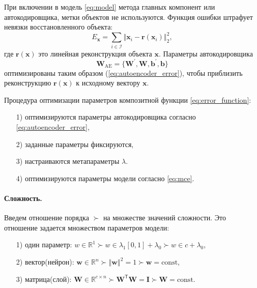 \documentclass[12pt, twoside]{article}
\newcommand{\xb}{{\mathbf{x}}}
\newcommand{\x}{{\mathbf{x}}}
\newcommand{\wvec}{{\mathbf{W}}}
\newcommand{\w}{{\mathbf{W}}}
\newcommand{\wm}{{\mathbf{w}}}
\begin{document}
При включении в модель \eqref{eq:model} метода главных компонент или автокодировщика, метки объектов не используются. Функция ошибки штрафует невязки восстановленного объекта:
\begin{equation}\label{eq:autoencoder_error}
E_\mathbf{x} = \sum_{i\in\mathcal{I}}\left\Vert{\xb_i-\mathbf{r}(\xb_i)}\right\Vert_2^2,
\end{equation}
где $\mathbf{r}(\x)$  это линейная реконструкция объекта $\x$. 
Параметры автокодировщика
\begin{equation}
\textbf{W}_{\text{AE}} = \{\w^{'},\w,\mathbf{b}^{'},\mathbf{b}\}
\end{equation}
оптимизированы таким образом (\ref{eq:autoencoder_error}), чтобы приблизить реконструкцию $\mathbf{r}(\x)$ к исходному вектору $\x$.

Процедура оптимизации параметров композитной функции \eqref{eq:error_function}:

\begin{enumerate}
\item[1)]
оптимизируются параметры автокодировщика согласно \eqref{eq:autoencoder_error},
\item[2)]
заданные параметры фиксируются,
\item[3)]
настраиваются метапараметры $\lambda$.
\item[4)]
оптимизируются параметры модели согласно \eqref{eq:mce}.
\end{enumerate}

\paragraph{Сложность.}
Введем отношение порядка $\succ$ на множестве значений сложности. Это отношение задается множеством параметров модели:
\begin{enumerate}
\item[1)] один параметр: $w\in \mathbb{R}^1 \succ w \in \lambda_1 [0,1] +\lambda_0 \succ w\in c +\lambda_0$,
\item[2)] вектор(нейрон): $\wm\in \mathbb{R}^n \succ \left\Vert \wm \right\Vert^2 =1 \succ \wm= \text{const}$,
\item[3)] матрица(слой): $\wvec\in \mathbb{R}^{c{\times}n} \succ \wvec^\mathsf{T}\wvec = \mathbf{I} \succ \wvec= \text{const}$.
\end{enumerate}
\end{document}
